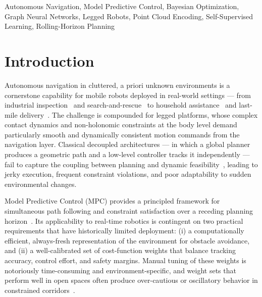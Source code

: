 \documentclass[conference]{IEEEtran}
\begin{document}
\begin{IEEEkeywords}
	Autonomous Navigation, Model Predictive Control, Bayesian Optimization, Graph Neural Networks, Legged Robots, Point Cloud Encoding, Self-Supervised Learning, Rolling-Horizon Planning
\end{IEEEkeywords}

\section{Introduction}
\label{sec:introduction}

Autonomous navigation in cluttered, a priori unknown environments is a cornerstone capability for mobile robots deployed in real-world settings — from industrial inspection~\cite{@TODO} and search-and-rescue~\cite{@TODO} to household assistance~\cite{@TODO} and last-mile delivery~\cite{@TODO}. The challenge is compounded for legged platforms, whose complex contact dynamics and non-holonomic constraints at the body level demand particularly smooth and dynamically consistent motion commands from the navigation layer. Classical decoupled architectures — in which a global planner produces a geometric path and a low-level controller tracks it independently — fail to capture the coupling between planning and dynamic feasibility~\cite{@TODO}, leading to jerky execution, frequent constraint violations, and poor adaptability to sudden environmental changes.

Model Predictive Control (MPC) provides a principled framework for simultaneous path following and constraint satisfaction over a receding planning horizon~\cite{@TODO}. Its applicability to real-time robotics is contingent on two practical requirements that have historically limited deployment: (i) a computationally efficient, always-fresh representation of the environment for obstacle avoidance, and (ii) a well-calibrated set of cost-function weights that balance tracking accuracy, control effort, and safety margins. Manual tuning of these weights is notoriously time-consuming and environment-specific, and weight sets that perform well in open spaces often produce over-cautious or oscillatory behavior in constrained corridors~\cite{@TODO}.
\end{document}
